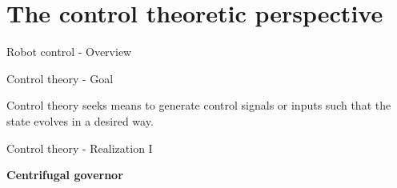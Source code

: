 \documentclass[usenames,dvipsnames,xcolor=table]{beamer}
\begin{document}
\section{The control theoretic perspective}
\begin{frame}{Robot control - Overview}
\begin{center}
\end{center}
\end{frame}
\begin{frame}{Control theory - Goal}
\begin{center}
{\large Control theory seeks means to generate control signals or inputs such that the state evolves in a desired way. }
\end{center}
\end{frame}
\begin{frame}{Control theory - Realization I}
\begin{center}
	\vspace{-6pt}
    \textbf{\Large Centrifugal governor\\[4pt]}
    \def\svgwidth{.5\linewidth}
    
\end{center}
\end{frame}
\end{document}
